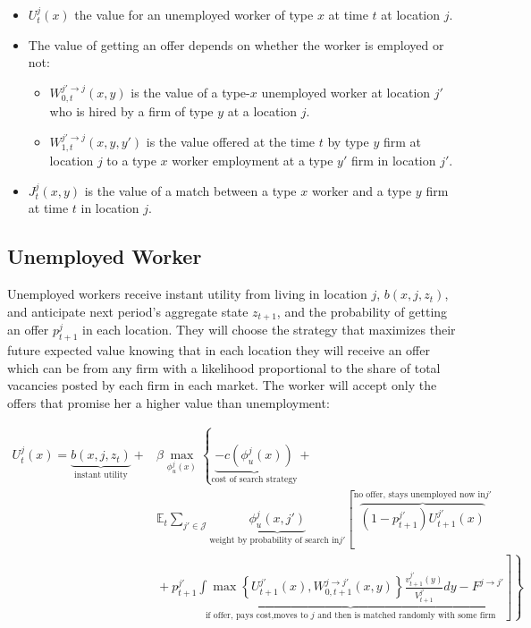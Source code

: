 \documentclass[
  letterpaper,
  DIV=11,
  numbers=noendperiod]{scrreprt}
\providecommand{\tightlist}{%
  \setlength{\itemsep}{0pt}\setlength{\parskip}{0pt}}\usepackage{longtable,booktabs,array}
\begin{document}
\begin{itemize}
\tightlist
\item
  \(U^{j}_t(x)\) the value for an unemployed worker of type \(x\) at
  time \(t\) at location \(j\).
\item
  The value of getting an offer depends on whether the worker is
  employed or not:

  \begin{itemize}
  \tightlist
  \item
    \(W^{j'\to j}_{0, t}(x,y)\) is the value of a type-\(x\) unemployed
    worker at location \(j'\) who is hired by a ﬁrm of type \(y\) at a
    location \(j\).
  \item
    \(W^{j'\to j}_{1, t}(x,y,y')\) is the value offered at the time
    \(t\) by type \(y\) firm at location \(j\) to a type \(x\) worker
    employment at a type \(y'\) firm in location \(j'\).
  \end{itemize}
\item
  \(J^j_t(x,y)\) is the value of a match between a type \(x\) worker and
  a type \(y\) firm at time \(t\) in location \(j\).
\end{itemize}

\hypertarget{unemployed-worker}{%
\subsection{Unemployed Worker}\label{unemployed-worker}}

Unemployed workers receive instant utility from living in location
\(j\), \(b(x,j, z_t)\), and anticipate next period's aggregate state
\(z_{t+1}\), and the probability of getting an offer \(p^j_{t+1}\) in
each location. They will choose the strategy that maximizes their future
expected value knowing that in each location they will receive an offer
which can be from any firm with a likelihood proportional to the share
of total vacancies posted by each firm in each market. The worker will
accept only the offers that promise her a higher value than
unemployment:

\begin{align*}
U^{j}_{t}(x) = \underbrace{b(x,j,z_t)}_{\text{instant utility}} + &\beta\max_{\phi^j_u(x)}\left\{ \underbrace{-c(\phi^j_u(x))}_{\text{cost of search strategy}} \right.  + \\
& \mathbb{E}_{t}\sum_{j'\in \mathcal{J}} \underbrace{\phi^j_u(x, j')}_{\text{weight by probability of search in} j'}\left[ \overbrace{(1-p^{j'}_{t+1})U^{j'}_{t+1}(x)}^{\text{no offer, stays unemployed now in} j'} \right.  \\
& \left. \left. \hspace{0cm} + p^{j'}_{t+1} \underbrace{\int \max\left\{U^{j'}_{t+1}(x),W^{j\to j'}_{0, t+1}(x,y)\right\}\frac{v^{j'}_{t+1}(y)}{V^{j'}_{t+1}}dy - F^{j \to j'}}_{\text{if offer, pays cost,moves to } j \text{ and then is matched randomly with some firm}} \right] \right\} 
\end{align*}
\end{document}
